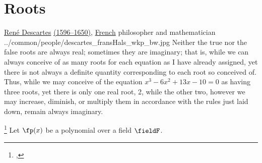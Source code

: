 \section{Roots}
\qboxnpq
  {\href{http://en.wikipedia.org/wiki/Descartes}{Ren\'e Descartes}
   \href{http://www-history.mcs.st-andrews.ac.uk/Timelines/TimelineC.html}{(1596--1650)},
   \href{http://www-history.mcs.st-andrews.ac.uk/BirthplaceMaps/Places/France.html}{French}
   philosopher and mathematician\footnotemark
  }
  {../common/people/descartes_fransHals_wkp_bw.jpg}
  {Neither the true nor the false roots are always real;
   sometimes they are imaginary;
   that is, while we can always conceive of as many roots for each equation
   as I have already assigned,
   yet there is not always a definite quantity corresponding to each root so conceived of.
   Thus, while we may conceive of the equation
   $x^3-6x^2+13x-10=0$ as having three roots,
   yet there is only one real root, 2, while the other two,
   however we may increase, diminish, or multiply them in accordance with the rules just laid down,
   remain always imaginary.}

\begin{theorem}
\footnote{
  ,
  }
Let $\fp(x)$ be a polynomial over a field $\fieldF$.
\end{theorem}


